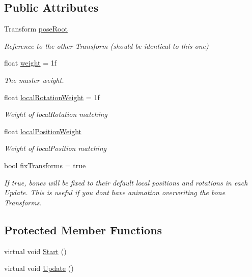 \subsection*{Public Attributes}
\begin{DoxyCompactItemize}
\item 
Transform \mbox{\hyperlink{class_root_motion_1_1_final_i_k_1_1_poser_adab1ab1d067ac6ddf6df04ffbb9c96bb}{pose\+Root}}
\begin{DoxyCompactList}\small\item\em Reference to the other Transform (should be identical to this one) \end{DoxyCompactList}\item 
float \mbox{\hyperlink{class_root_motion_1_1_final_i_k_1_1_poser_a386d7427ccd5ed4e36f586b48435b94b}{weight}} = 1f
\begin{DoxyCompactList}\small\item\em The master weight. \end{DoxyCompactList}\item 
float \mbox{\hyperlink{class_root_motion_1_1_final_i_k_1_1_poser_ab3de4b9258766840623d60d706bfcbf8}{local\+Rotation\+Weight}} = 1f
\begin{DoxyCompactList}\small\item\em Weight of local\+Rotation matching \end{DoxyCompactList}\item 
float \mbox{\hyperlink{class_root_motion_1_1_final_i_k_1_1_poser_a11cac4a9c5dc5db9337e94a30202af3a}{local\+Position\+Weight}}
\begin{DoxyCompactList}\small\item\em Weight of local\+Position matching \end{DoxyCompactList}\item 
bool \mbox{\hyperlink{class_root_motion_1_1_final_i_k_1_1_poser_a4f05f4749055329895ecab5f357367ef}{fix\+Transforms}} = true
\begin{DoxyCompactList}\small\item\em If true, bones will be fixed to their default local positions and rotations in each Update. This is useful if you don\textquotesingle{}t have animation overwriting the bone Transforms. \end{DoxyCompactList}\end{DoxyCompactItemize}
\subsection*{Protected Member Functions}
\begin{DoxyCompactItemize}
\item 
virtual void \mbox{\hyperlink{class_root_motion_1_1_final_i_k_1_1_poser_a7efdee80ce26a62a3ec056bb4e261a1c}{Start}} ()
\item 
virtual void \mbox{\hyperlink{class_root_motion_1_1_final_i_k_1_1_poser_a6391829da5511103e032ce27db9bfe88}{Update}} ()
\end{DoxyCompactItemize}


